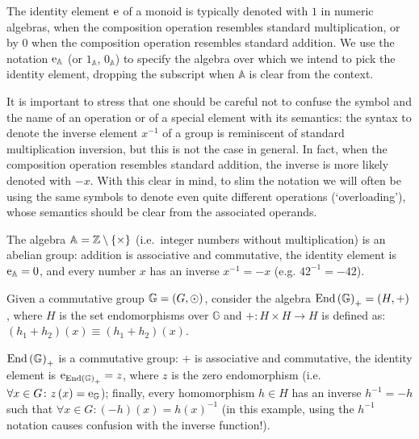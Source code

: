 The identity element \(\mathrm{e} \) of a monoid is typically denoted with \(1\) in 
numeric algebras, when the composition operation resembles standard multiplication, or by \(0\) 
when the composition operation resembles standard addition. 
We use the notation \(\mathrm{e}_{\mathbb{A}}\) (or \(1_{\mathbb{A}}\), 
\(0_{\mathbb{A}}\)) to specify the algebra over which we intend to pick the identity element, 
dropping the subscript when \(\mathbb{A}\) is clear from the context.

It is important to stress that one should be careful not to confuse the symbol and the name of an 
operation or of a special element with its semantics: the syntax to denote the inverse element 
\(x^{-1}\) of a group is reminiscent of standard multiplication inversion, but this is not the 
case in general.
In fact, when the composition operation resembles standard addition, the inverse is more likely 
denoted with \(-x\).
With this clear in mind, to slim the notation we will often be using the same symbols to denote 
even quite different operations (`overloading'), whose semantics should be clear from the 
associated operands. 

\begin{example}
  The algebra \(\mathbb{A} = \mathbb{Z} \setminus \left\{\times\right\}\) (i.e.\ integer numbers 
  without multiplication) is an abelian group: 
  addition is associative and commutative, the identity element is 
  \(\mathrm{e}_{\mathbb{A}} = 0\), and every number \(x\) has an inverse \(x^{-1} = -x\) 
  (e.g. \({42}^{-1} = -42\)). 
\end{example}

\begin{example}\label{ex:endo_group}
  Given a commutative group \(\mathbb{G} = \left(G, \odot\right)\), consider the algebra 
  \(\mathrm{End}\left(\mathbb{G}\right)_{+} = \left(H, +\right)\), where \(H\) is the set endomorphisms over 
  \(\mathbb{G}\) and \(+\colon H \times H \to H\) is defined as: 
  \(\left(h_1 + h_2\right)\left(x\right) \equiv \left(h_1 + h_2\right)\left(x\right)\).

  \(\mathrm{End}\left(\mathbb{G}\right)_{+}\) is a commutative group: \(+\) is associative and 
  commutative, the identity element is \(\mathrm{e}_{\mathrm{End}\left(\mathbb{G}\right)_{+}} = z\), where
  \(z\) is the zero endomorphism (i.e. \(\forall x \in G\colon z\left(x\right) = 
  \mathrm{e}_{\mathbb{G}}\)); finally, every homomorphism \(h \in H\) has an inverse 
  \(h^{-1} = -h\) such that \(\forall x \in G\colon \left(-h\right)\left(x\right) = 
  {h\left(x\right)}^{-1}\) (in this example, using the \(h^{-1}\) notation causes confusion with 
  the inverse function!).
\end{example}

